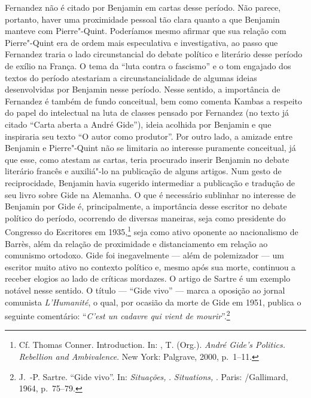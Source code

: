 Fernandez não é citado por Benjamin em cartas desse período. Não parece,
portanto, haver uma proximidade pessoal tão clara quanto a que Benjamin
manteve com Pierre"-Quint. Poderíamos mesmo afirmar que sua relação com
Pierre"-Quint era de ordem mais especulativa e investigativa, ao passo
que Fernandez traria o lado circunstancial do debate político e
literário desse período de exílio na França. O tema da ``luta contra o
fascismo'' e o tom engajado dos textos do período atestariam a
circunstancialidade de algumas ideias desenvolvidas por Benjamin nesse
período. Nesse sentido, a importância de Fernandez é também de fundo
conceitual, bem como comenta Kambas a respeito do papel do intelectual
na luta de classes pensado por Fernandez (no texto já citado ``Carta
aberta a André Gide''), ideia acolhida por Benjamin e que inspiraria seu
texto ``O autor como produtor''. Por outro lado, a amizade entre
Benjamin e Pierre"-Quint não se limitaria ao interesse puramente
conceitual, já que esse, como atestam as cartas, teria procurado
inserir Benjamin no debate literário francês e auxiliá"-lo na publicação
de alguns artigos. Num gesto de reciprocidade, Benjamin havia sugerido intermediar a publicação e tradução de seu livro sobre Gide na Alemanha. O que é
necessário sublinhar no interesse de Benjamin por Gide é,
principalmente, a importância desse escritor no debate político do
período, ocorrendo de diversas maneiras, seja como presidente do
Congresso do Escritores em 1935,\footnote{Cf. Thomas Conner.
  Introduction. In: , T. (Org.). \emph{André Gide's Politics.
  Rebellion and Ambivalence}. New York: Palgrave, 2000, p.~1--11.} seja
como ativo oponente ao nacionalismo de Barrès, além da relação de
proximidade e distanciamento em relação ao comunismo ortodoxo. Gide foi
inegavelmente --- além de polemizador --- um escritor muito ativo no
contexto político e, mesmo após sua morte, continuou a receber elogios
ao lado de críticas mordazes. O artigo de Sartre é um exemplo notável
nesse sentido. O título --- ``Gide vivo'' --- marca a oposição ao jornal
comunista \emph{L'Humanité}, o qual, por ocasião da morte de Gide em
1951, publica o seguinte comentário: ``\emph{C'est un cadavre qui vient de
mourir}''.\footnote{J.~-P. Sartre. ``Gide vivo''. In: \emph{Situações, }.
  \emph{Situations, }. Paris: /Gallimard, 1964, p.~75--79.}


